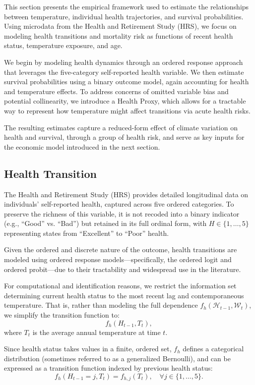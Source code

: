 \documentclass{article}
\begin{document}
This section presents the empirical framework used to estimate
the relationships between temperature,
individual health trajectories, and survival probabilities.
Using microdata from the Health and Retirement Study (HRS),
we focus on modeling health transitions and mortality risk
as functions of recent health status, temperature exposure, and age.

We begin by modeling health dynamics through an ordered response approach that
leverages the five-category self-reported health variable.
We then estimate survival probabilities using a binary outcome model,
again accounting for health and temperature effects.
To address concerns of omitted variable bias and potential collinearity, 
we introduce a Health Proxy, which allows for a tractable way to represent how
temperature might affect transitions via acute health risks. 

The resulting estimates capture a reduced-form
effect of climate variation on health and survival,
through a group of health risk,
and serve as key inputs for the economic
model introduced in the next section.

\subsection{Health Transition}

The Health and Retirement Study (HRS) provides detailed longitudinal data on individuals’ self-reported health, captured across five ordered categories.
To preserve the richness of this variable, it is not recoded into a binary indicator (e.g., “Good” vs. “Bad”) but retained in its full ordinal form, with $H \in \{1,\dots,5\}$ representing states from “Excellent” to “Poor” health.

Given the ordered and discrete nature of the outcome, health transitions are modeled using ordered response models—specifically, the ordered logit and ordered probit—due to their tractability and widespread use in the literature.

For computational and identification reasons, we restrict the information set determining current health status to the most recent lag and contemporaneous temperature. That is, rather than modeling the full dependence $f_h(\mathcal{H}_{t-1}, \mathcal{W}_{t})$, we simplify the transition function to:
\[
f_{h}(H_{t-1}, T_{t}),
\]
where $T_t$ is the average annual temperature at time $t$.

Since health status takes values in a finite, ordered set, $f_h$ defines a categorical distribution (sometimes referred to as a generalized Bernoulli), and can be expressed as a transition function indexed by previous health status:
\[
f_{h}(H_{t-1} = j, T_{t}) = f_{h,j}(T_{t}), \quad \forall j \in \{1,\dots,5\}.
\]
\end{document}
